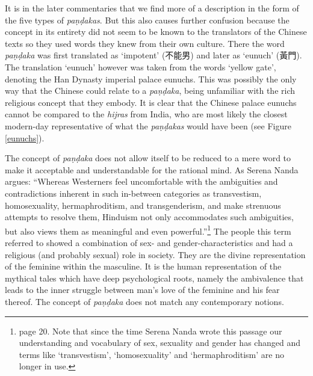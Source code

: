 It is in the later commentaries that we find more of a description in the form of the five types of {\em paṇḍakas}. But this also causes further confusion because the concept in its entirety did not seem to be known to the translators of the Chinese texts so they used words they knew from their own culture. There the word {\em paṇḍaka} was first translated as `impotent' (不能男) and later as `eunuch' (黃門). The translation `eunuch' however was taken from the words `yellow gate', denoting the Han Dynasty imperial palace eunuchs. This was possibly the only way that the Chinese could relate to a {\em paṇḍaka}, being unfamiliar with the rich religious concept that they embody. It is clear that the Chinese palace eunuchs cannot be compared to the {\em hijras} from India, who are most likely the closest modern-day representative of what the {\em paṇḍakas} would have been (see Figure \ref{eunuchs}).

The concept of {\em paṇḍaka} does not allow itself to be reduced to a mere word to make it acceptable and understandable for the rational mind. As Serena Nanda argues: ``Whereas Westerners feel uncomfortable with the ambiguities and contradictions inherent in such in-between categories as transvestism, homosexuality, hermaphroditism, and transgenderism, and make strenuous attempts to resolve them, Hinduism not only accommodates such ambiguities, but also views them as meaningful and even powerful.''\footnote{\cite{nanda} page 20. Note that since the time Serena Nanda wrote this passage our understanding and vocabulary of sex, sexuality and gender has changed and terms like `transvestism', `homosexuality' and `hermaphroditism' are no longer in use.} The people this term referred to showed a combination of sex- and gender-characteristics and had a religious (and probably sexual) role in society. They are the divine representation of the feminine within the masculine. It is the human representation of the mythical tales which have deep psychological roots, namely the ambivalence that leads to the inner struggle between man's love of the feminine and his fear thereof. The concept of {\em paṇḍaka} does not match any contemporary notions. 
